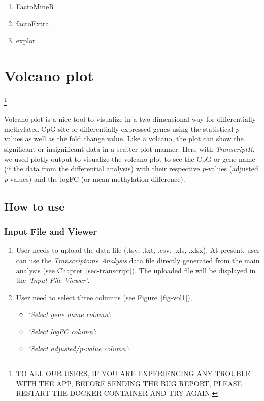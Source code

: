 \documentclass[
  a4paper,
  DIV=11,
  numbers=noendperiod,
  oneside,
  open=any]{scrreport}
\providecommand{\tightlist}{%
  \setlength{\itemsep}{0pt}\setlength{\parskip}{0pt}}\usepackage{longtable,booktabs,array}
\begin{document}
\begin{enumerate}
\def\labelenumi{\arabic{enumi}.}
\tightlist
\item
  \href{https://cran.r-project.org/web/packages/FactoMineR/FactoMineR.pdf}{FactoMineR}
\item
  \href{https://cran.r-project.org/web/packages/factoextra/factoextra.pdf}{factoExtra}
\item
  \href{https://cran.r-project.org/web/packages/explor/explor.pdf}{explor}
\end{enumerate}

\chapter{Volcano plot}\label{sec-volcano}

\footnote{TO ALL OUR USERS, IF YOU ARE EXPERIENCING ANY TROUBLE WITH THE
  APP, BEFORE SENDING THE BUG REPORT, PLEASE RESTART THE DOCKER
  CONTAINER AND TRY AGAIN.}

Volcano plot is a nice tool to visualize in a two-dimensional way for
differentially methylated CpG site or differentially expressed genes
using the statistical \emph{p}-values as well as the fold change value.
Like a volcano, the plot can show the significant or insignificant data
in a scatter plot manner. Here with \emph{TranscriptR}, we used plotly
output to visualize the volcano plot to see the CpG or gene name (if the
data from the differential analysis) with their respective
\emph{p}-values (adjusted \emph{p}-values) and the logFC (or mean
methylation difference).

\section{How to use}\label{how-to-use-3}

\subsection{Input File and Viewer}\label{input-file-and-viewer}

\begin{enumerate}
\def\labelenumi{\arabic{enumi}.}
\tightlist
\item
  User needs to upload the data file (.tsv, .txt, .csv, .xls, .xlsx). At
  present, user can use the \emph{Transcriptome Analysis} data file
  directly generated from the main analysis (see
  Chapter~\ref{sec-transcript}). The uploaded file will be displayed in
  the \emph{`Input File Viewer'}.
\item
  User need to select three columns (see Figure~\ref{fig-vol1}),

  \begin{itemize}
  \tightlist
  \item
    \emph{`Select gene name column'}:
  \item
    \emph{`Select logFC column'}:
  \item
    \emph{`Select adjusted/p-value column'}:
  \end{itemize}
\end{enumerate}
\end{document}
